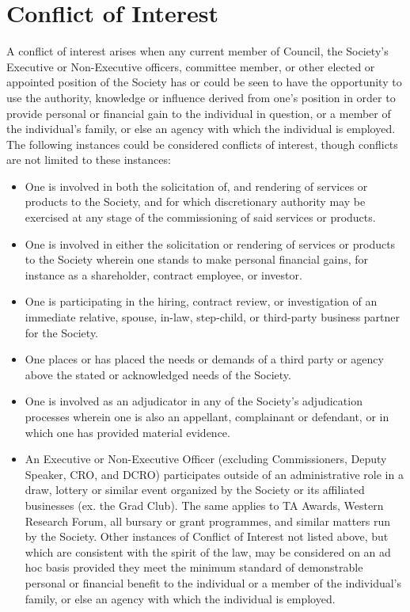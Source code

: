 \section{Conflict of Interest}
\begin{longenum}[ label*=\thesection.\arabic*., align=left]
	\item A conflict of interest arises when any current member of Council, the Society's Executive or Non-Executive officers, committee member, or other elected or appointed position of the Society has or could be seen to have the opportunity to use the authority, knowledge or influence derived from one's position in order to provide personal or financial gain to the individual in question, or a member of the individual's family, or else an agency with which the individual is employed. The following instances could be  considered conflicts of interest, though conflicts are not limited to these instances: 
    \begin{itemize}
    	\item One is involved in both the solicitation of, and rendering of services or products to the Society, and for  which discretionary authority may be exercised at any stage  of the commissioning of said services or products.
        \item One is involved in either the solicitation or rendering of services or products to the Society wherein one stands to make personal financial gains, for instance as a shareholder, contract employee, or investor.
        \item One is participating in the hiring, contract review, or investigation of an immediate relative, spouse, in-law, step-child, or third-party business partner for the Society. 
        \item One places or has placed the needs or demands of a third party or agency above the stated or acknowledged needs of the Society. 
        \item One is involved as an adjudicator in any of the Society's adjudication processes wherein one is also an appellant, complainant or defendant, or in which one has provided material evidence.
        \item An Executive or Non-Executive Officer (excluding
Commissioners, Deputy Speaker, CRO, and DCRO) participates outside of an administrative role in a draw, lottery or similar event organized by the Society or its affiliated businesses (ex. the Grad Club). The same applies to TA Awards, Western Research Forum, all bursary or grant programmes, and similar matters run by the Society. Other instances of Conflict of Interest not listed above, but which are consistent with the spirit of the law, may be considered on an ad hoc basis provided they meet the minimum standard of demonstrable personal or financial benefit to the individual or a member of the individual's family,  or else an agency with which the individual is employed.

\end{itemize}
\end{longenum}
